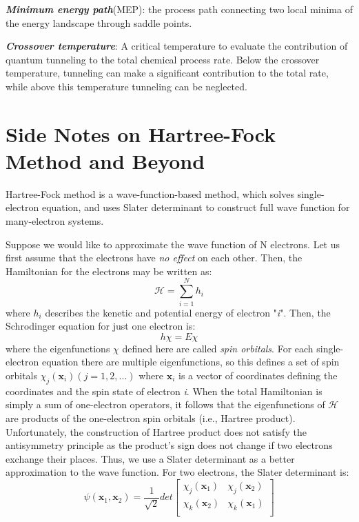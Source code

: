 \documentclass[12pt]{article}
\begin{document}
\textbf{\textit{Minimum energy path}}(MEP): the process path connecting two local minima of the energy landscape through saddle points.

\textbf{\textit{Crossover temperature}}: A critical temperature to evaluate the contribution of quantum tunneling to the total chemical process rate. Below the crossover temperature, tunneling can make a significant contribution to the total rate, while above this temperature tunneling can be neglected.

\section{Side Notes on Hartree-Fock Method and Beyond}
Hartree-Fock method is a wave-function-based method, which solves single-electron equation, and uses Slater determinant to construct full wave function for many-electron systems.

Suppose we would like to approximate the wave function of N electrons. Let us first assume that the electrons have \textit{no effect} on each other. Then, the Hamiltonian for the electrons may be written as:
\begin{equation}
    \mathcal{H} = \sum_{i=1}^N h_i
\end{equation}
where $h_i$ describes the kenetic and potential energy of electron "\textit{i}". Then, the Schrodinger equation for just one electron is:
\begin{equation}
    h\chi = E\chi
\end{equation}
where the eigenfunctions $\chi$ defined here are called \textit{spin orbitals}. For each single-electron equation there are multiple eigenfunctions, so this defines a set of spin orbitals $\chi_j(\boldsymbol{x}_i)(j=1,2,...)$ where $\boldsymbol{x}_i$ is a vector of coordinates defining the coordinates and the spin state of electron \textit{i}. When the total Hamiltonian is simply a sum of one-electron operators, it follows that the eigenfunctions of $\mathcal{H}$ are products of the one-electron spin orbitals (i.e., Hartree product). Unfortunately, the construction of Hartree product does not satisfy the antisymmetry principle as the product's sign does not change if two electrons exchange their places. Thus, we use a Slater determinant as a better approximation to the wave function. For two electrons, the Slater determinant is:
\begin{equation}
    \psi(\boldsymbol{x}_1, \boldsymbol{x}_2) = \frac{1}{\sqrt{2}}det
  \left[ {\begin{array}{cc}
   \chi_j(\boldsymbol{x}_1) & \chi_j(\boldsymbol{x}_2)\\
   \chi_k(\boldsymbol{x}_2) & \chi_k(\boldsymbol{x}_1) \\
  \end{array} } \right]
\end{equation}
\end{document}
